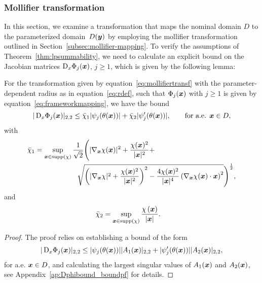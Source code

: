 \subsubsection{Mollifier transformation}
\label{subsubsec:explicittransformation}
In this section, we examine a transformation that maps the nominal domain ${D}$ to the parameterized domain $\mathop{}{D}({\bm{y}})$ by employing the mollifier transformation outlined in Section~\ref{subsec:mollifier-mapping}.
To verify the assumptions of Theorem~\ref{thm:lpsummability}, we need to calculate an explicit bound on the Jacobian matrices $\mathop{}\!\mathrm{D}_x\Phi_j({{\bm{x}}})$, $j \geq 1$, which is given by the following lemma:
\begin{lemma}\label{lem:Dphibound}
For the transformation given by equation~\eqref{eq:mollifiertransf} with the parameter-dependent radius as in equation~\eqref{eq:rdef}, such that $\Phi_j({{\bm{x}}})$ with $j\geq 1$ is given by equation~\eqref{eq:frameworkmapping}, we have the bound
\begin{equation}
    |\mathop{}\!\mathrm{D}_x\Phi_j({{\bm{x}}})|_{2,2} \leq \bar{\chi}_1 | \psi_j(\theta({{\bm{x}}})) | +  \bar{\chi}_2 |\psi_j'(\theta({{\bm{x}}}))  |, \qquad \text{for a.e. } {{\bm{x}}} \in {D}, \label{eq:dphijbound}
\end{equation}
with
\begin{align}
    \bar{\chi}_1 &= \sup_{{{\bm{x}}} \in \mathrm{supp}(\chi)} \frac{1}{\sqrt{2}} \Bigg( |\nabla_{{{\bm{x}}}} \chi({{\bm{x}}})|^2  +\frac{\chi({{\bm{x}}})^2}{|{{\bm{x}}}|^2}  +\nonumber \\
    &\qquad \qquad \qquad \sqrt{\left( |\nabla_{{{\bm{x}}}} \chi|^2  +\frac{\chi({{\bm{x}}})^2}{|{{\bm{x}}}|^2}   \right)^2-\frac{4\chi({{\bm{x}}})^2}{|{{\bm{x}}}|^4}  \left( \nabla_{{{\bm{x}}}}\chi({{\bm{x}}})\cdot {{\bm{x}}} \right) ^2}  \Bigg)^{\frac{1}{2}},
\end{align}
and
\begin{align}
    \bar{\chi}_2 &= \sup_{{{\bm{x}}} \in \mathrm{supp}(\chi)}  \frac{\chi\left({{\bm{x}}}\right)}{|{{\bm{x}}}| }.
\end{align}
\end{lemma}
\begin{proof}
    The proof relies on establishing a bound of the form
    \begin{align*}
        |\mathop{}\!\mathrm{D}_x\Phi_j({{\bm{x}}})|_{2,2} \leq| \psi_j(\theta({{\bm{x}}})) ||  A_1({{\bm{x}}}) |_{2,2}  +  |  \psi_j'(\theta({{\bm{x}}}))  || A_2({{\bm{x}}})|_{2,2},
    \end{align*}
    for a.e. ${{\bm{x}}} \in D$, and calculating the largest singular values of $A_1({{\bm{x}}})$ and $A_2({{\bm{x}}})$, see Appendix~\ref{ap:Dphibound_boundpf} for details.
\end{proof}

